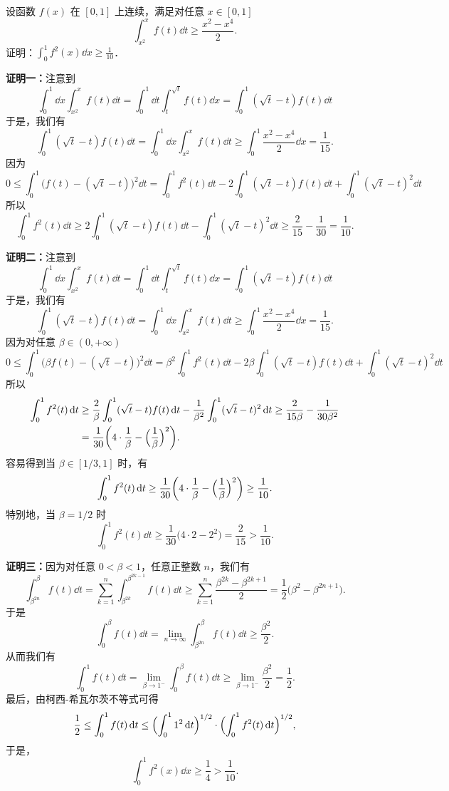 设函数 $f(x)$ 在 $[0,1]$ 上连续，满足对任意 $x\in[0,1]$
\[
  \int_{x^{2}}^{x}f(t)\dd t\ge\frac{x^{2}-x^{4}}{2}.
\]
证明：$\displaystyle\int_{0}^{1}f^{2}(x)\dd x\ge\frac{1}{10}$．
\begin{solution}
\textbf{证明一：}注意到
\[
  \int_{0}^{1}\dd x\int_{x^{2}}^{x}f(t)\dd t
  =\int_{0}^{1}\dd t\int_{t}^{\sqrt{t}}f(t)\dd x
  =\int_{0}^{1}(\sqrt{t}-t)f(t)\dd t
\]
于是，我们有
\[
  \int_{0}^{1}(\sqrt{t}-t)f(t)\dd t=\int_{0}^{1}\dd x\int_{x^{2}}^{x}f(t)\dd t
  \ge\int_{0}^{1}\frac{x^{2}-x^{4}}{2}\dd x=\frac{1}{15}.
\]
因为
\[
  0\le\int_{0}^{1}\bigl(f(t)-(\sqrt{t}-t)\bigr)^{2}\dd t
  =\int_{0}^{1}f^{2}(t)\dd t-2\int_{0}^{1}(\sqrt{t}-t)f(t)\dd t+\int_{0}^{1}(\sqrt{t}-t)^{2}\dd t
\]
所以
\[
  \int_{0}^{1}f^{2}(t)\dd t\ge 2\int_{0}^{1}(\sqrt{t}-t)f(t)\dd t-\int_{0}^{1}(\sqrt{t}-t)^{2}\dd t
  \ge\frac{2}{15}-\frac{1}{30}=\frac{1}{10}.
\]

\textbf{证明二：}注意到
\[
  \int_{0}^{1}\dd x\int_{x^{2}}^{x}f(t)\dd t
  =\int_{0}^{1}\dd t\int_{t}^{\sqrt{t}}f(t)\dd x
  =\int_{0}^{1}(\sqrt{t}-t)f(t)\dd t
\]
于是，我们有
\[
  \int_{0}^{1}(\sqrt{t}-t)f(t)\dd t=\int_{0}^{1}\dd x\int_{x^{2}}^{x}f(t)\dd t
  \ge\int_{0}^{1}\frac{x^{2}-x^{4}}{2}\dd x=\frac{1}{15}.
\]
因为对任意 $\beta\in(0,+\infty)$
\[
  0\le\int_{0}^{1}\bigl(\beta f(t)-(\sqrt{t}-t)\bigr)^{2}\dd t
  =\beta^{2}\int_{0}^{1}f^{2}(t)\dd t-2\beta\int_{0}^{1}(\sqrt{t}-t)f(t)\dd t+\int_{0}^{1}(\sqrt{t}-t)^{2}\dd t
\]
所以
\begin{align*}
  \int_{0}^{1}f^{2}(t)\,\mathrm{d} t
  &\ge\frac{2}{\beta}\int_{0}^{1}(\sqrt{t}-t)f(t)\,\mathrm{d} t-\frac{1}{\beta^{2}}\int_{0}^{1}(\sqrt{t}-t)^{2}\,\mathrm{d} t
  \ge\frac{2}{15\beta}-\frac{1}{30\beta^{2}}\\
  &=\frac{1}{30}\biggl(4\cdot\frac{1}{\beta}-\Bigl(\frac{1}{\beta}\Bigr)^{2}\biggr).
\end{align*}
容易得到当 $\beta\in[1/3,1]$ 时，有
\[
  \int_{0}^{1}f^{2}(t)\,\mathrm{d} t\ge\frac{1}{30}\biggl(4\cdot\frac{1}{\beta}-\Bigl(\frac{1}{\beta}\Bigr)^{2}\biggr)\ge\frac{1}{10}.
\]
特别地，当 $\beta=1/2$ 时
\[
  \int_{0}^{1}f^{2}(t)\dd t\ge\frac{1}{30}\bigl(4\cdot 2-2^{2}\bigr)=\frac{2}{15}>\frac{1}{10}.
\]

\textbf{证明三：}因为对任意 $0<\beta<1$，任意正整数 $n$，我们有
\[
  \int_{\beta^{2n}}^{\beta}f(t)\dd t=\sum_{k=1}^{n}\int_{\beta^{2k}}^{\beta^{2k-1}}f(t)\dd t
  \ge\sum_{k=1}^{n}\frac{\beta^{2k}-\beta^{2k+1}}{2}=\frac{1}{2}\bigl(\beta^{2}-\beta^{2n+1}\bigr).
\]
于是
\[
  \int_{0}^{\beta}f(t)\dd t=\lim_{n\to\infty}\int_{\beta^{2n}}^{\beta}f(t)\dd t\ge\frac{\beta^{2}}{2}.
\]
从而我们有
\[
  \int_{0}^{1}f(t)\dd t=\lim_{\beta\to1^{-}}\int_{0}^{\beta}f(t)\dd t\ge\lim_{\beta\to1^{-}}\frac{\beta^{2}}{2}=\frac{1}{2}.
\]
最后，由柯西-希瓦尔茨不等式可得
\[
  \frac{1}{2}\le\int_{0}^{1}f(t)\,\mathrm{d} t\le\Bigl(\int_{0}^{1}1^{2}\,\mathrm{d} t\Bigr)^{1/2}\cdot\Bigl(\int_{0}^{1}f^{2}(t)\,\mathrm{d} t\Bigr)^{1/2},
\]
于是，
\[
  \int_{0}^{1}f^{2}(x)\dd x\ge\frac{1}{4}>\frac{1}{10}.
\]
\end{solution}
